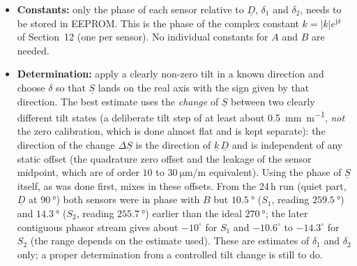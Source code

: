 \documentclass[11pt,a4paper]{article}
\begin{document}
\begin{itemize}
        sample of a period, the natural zero of the convention used here.
        It also keeps all values away from the $0^{\circ}/360^{\circ}$ wrap:
        with $\underline{D}$ at $\SI{90}{\degree}$, $A$ reads about
        $\SI{90.5}{\degree}$, $B$ about $\SI{269.5}{\degree}$ (symmetric,
        because $\underline{D}$ is the midpoint), and each sensor lies near
        $\SI{90}{\degree}$ (positive tilt, in phase with $A$) or near
        $\SI{270}{\degree}$ (negative tilt, in phase with $B$), instead of one
        value fluctuating around $\SI{0}{\degree}$ and jumping between
        $\SI{359}{\degree}$ and $\SI{1}{\degree}$.  Near zero tilt the
        amplitude of $\underline{S}$ vanishes, its phase is undefined and
        jumps between the two values whatever the reference; the sign of the
        reading comes from the projection, not from this angle, and the
        angle should only be displayed above an amplitude threshold.
  \item \textbf{Constants:} only the phase of each sensor relative to
        $\underline{D}$, $\delta_1$ and $\delta_2$, needs to be stored in
        EEPROM.  This is the phase of the complex constant $k=|k|e^{\mathrm{j}\delta}$
        of Section~12 (one per sensor).  No individual constants for $A$ and
        $B$ are needed.
  \item \textbf{Determination:} apply a clearly non-zero tilt in a known
        direction and choose $\delta$ so that $\underline{S}$ lands on the
        real axis with the sign given by that direction.  The best estimate
        uses the \emph{change} of $\underline{S}$ between two clearly different tilt
        states (a deliberate tilt step of at least about \SI{0.5}{\milli\metre\per\metre},
        \emph{not} the zero calibration, which is done almost flat and is kept
        separate): the direction of the change
        $\Delta\underline{S}$ is the direction of $\underline{k}\,\underline{D}$
        and is independent of any static offset (the quadrature zero offset
        and the leakage of the sensor midpoint, which are of order $10$ to
        $\SI{30}{\micro\metre\per\metre}$ equivalent).  Using the phase of
        $\underline{S}$ itself, as was done first, mixes in these offsets.
        From the 24\,h run (quiet part, $\underline{D}$ at $\SI{90}{\degree}$)
        both sensors were in phase with $B$ but $\SI{10.5}{\degree}$ ($S_1$,
        reading $\SI{259.5}{\degree}$) and $\SI{14.3}{\degree}$ ($S_2$, reading
        $\SI{255.7}{\degree}$) earlier than the ideal $\SI{270}{\degree}$; the
        later contiguous phasor stream gives about $-10^{\circ}$ for $S_1$ and
        $-10.6^{\circ}$ to $-14.3^{\circ}$ for $S_2$ (the range depends on the
        estimate used).  These are estimates of $\delta_1$ and $\delta_2$ only;
        a proper determination from a controlled tilt change is still to do.
\end{itemize}
\end{document}

